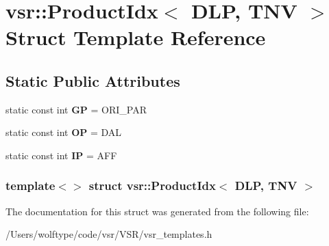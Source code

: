\hypertarget{structvsr_1_1_product_idx_3_01_d_l_p_00_01_t_n_v_01_4}{\section{vsr\-:\-:Product\-Idx$<$ D\-L\-P, T\-N\-V $>$ Struct Template Reference}
\label{structvsr_1_1_product_idx_3_01_d_l_p_00_01_t_n_v_01_4}
}
\subsection*{Static Public Attributes}
\begin{DoxyCompactItemize}
\item 
\hypertarget{structvsr_1_1_product_idx_3_01_d_l_p_00_01_t_n_v_01_4_ab756238a02c0cfb4798058c826bcf48f}{static const int {\bfseries G\-P} = O\-R\-I\-\_\-\-P\-A\-R}\label{structvsr_1_1_product_idx_3_01_d_l_p_00_01_t_n_v_01_4_ab756238a02c0cfb4798058c826bcf48f}

\item 
\hypertarget{structvsr_1_1_product_idx_3_01_d_l_p_00_01_t_n_v_01_4_ad4d30a2046b2fd7db804121158181131}{static const int {\bfseries O\-P} = D\-A\-L}\label{structvsr_1_1_product_idx_3_01_d_l_p_00_01_t_n_v_01_4_ad4d30a2046b2fd7db804121158181131}

\item 
\hypertarget{structvsr_1_1_product_idx_3_01_d_l_p_00_01_t_n_v_01_4_a602418e572ef07afcc7ee5edbfc05ed8}{static const int {\bfseries I\-P} = A\-F\-F}\label{structvsr_1_1_product_idx_3_01_d_l_p_00_01_t_n_v_01_4_a602418e572ef07afcc7ee5edbfc05ed8}

\end{DoxyCompactItemize}
\subsubsection*{template$<$$>$ struct vsr\-::\-Product\-Idx$<$ D\-L\-P, T\-N\-V $>$}



The documentation for this struct was generated from the following file\-:\begin{DoxyCompactItemize}
\item 
/\-Users/wolftype/code/vsr/\-V\-S\-R/vsr\-\_\-templates.\-h\end{DoxyCompactItemize}
